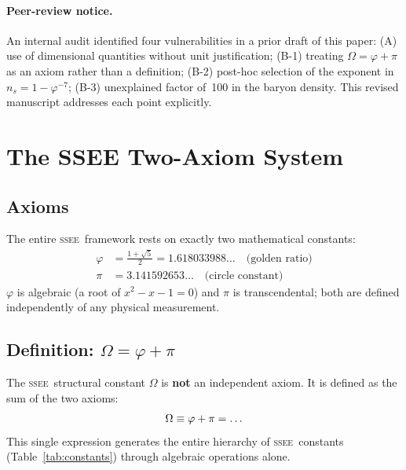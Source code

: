 \documentclass[12pt,a4paper]{article}
\newcommand{\SSEE}{\ifmmode\mathrm{SSEE}\else\textsc{ssee}\fi}
\begin{document}
\paragraph{Peer-review notice.}
An internal audit identified four vulnerabilities in a prior draft of this paper:
(A) use of dimensional quantities without unit justification;
(B-1) treating $\Omega = \varphi+\pi$ as an axiom rather than a definition;
(B-2) post-hoc selection of the exponent in $n_s = 1-\varphi^{-7}$;
(B-3) unexplained factor of~100 in the baryon density.
This revised manuscript addresses each point explicitly.

\section{The SSEE Two-Axiom System}
\label{sec:constants}

\subsection{Axioms}

The entire \SSEE\ framework rests on exactly two mathematical constants:
\begin{align}
\varphi &= \frac{1+\sqrt{5}}{2} = 1.618033988\ldots
          \quad\text{(golden ratio)} \\
\pi     &= 3.141592653\ldots
          \quad\text{(circle constant)}
\end{align}
$\varphi$ is algebraic (a root of $x^2-x-1=0$) and $\pi$ is transcendental; both are
defined independently of any physical measurement.

\subsection{Definition: \texorpdfstring{$\Omega = \varphi+\pi$}{Omega = phi+pi}}
\label{sec:omega}

The \SSEE\ structural constant $\Omega$ is \textbf{not} an independent axiom.
It is defined as the sum of the two axioms:
\begin{equation}
\Omega \equiv \varphi + \pi = \val{OMEGA_d9}\ldots
\label{eq:omega}
\end{equation}
This single expression generates the entire hierarchy of \SSEE\ constants
(Table~\ref{tab:constants}) through algebraic operations alone.
\end{document}
